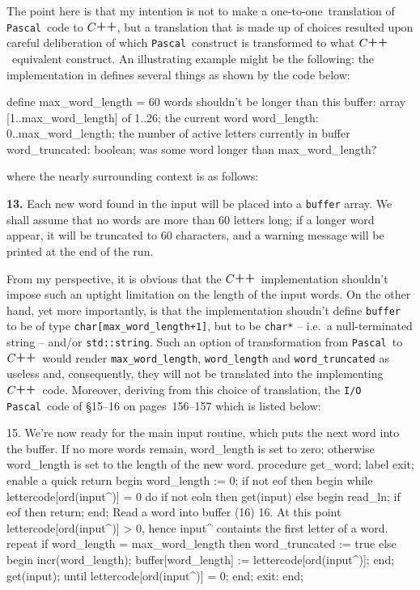 \documentclass[a4paper,11pt]{article}
\renewcommand{\=}{\protect\nobreakdash-\hspace{0pt}}
\renewcommand{\~}{\protect\nobreakdash--\hspace{0pt}}
\newcommand{\plusplus}{\textbf{\raisebox{1pt}{++}}}
\newcommand{\cplusplus}{$C\plusplus$}
\newcommand{\pascal}{\code{Pascal}}
\newcommand{\ie}{i.e.}
\newcommand{\code}[1]{{\tt{#1}}}
\newcommand\code*[1]{\mbox{\code{#1}}}
\newcommand{\pag}[1]{page~#1}
\newcommand{\pages}[2]{pages~#1\~#2}
\newcommand{\para}[1]{\mbox{\S\hspace{1pt}#1}}
\newcommand{\paras}[2]{\mbox{\S\hspace{1pt}#1--#2}}
\newcommand{\parapag}[3][]{%
	\ifthenelse{\not\equal{#1}{}}{%
		\para{#2}, \emph{#1}, on \pag{#3}%
	}{%
		\para{#2} on \pag{#3}%
	}%
}
\newcommand{\paraspages}[4]{\paras{#1}{#2} on \pages{#3}{#4}}
\newcommand{\onetoone}{one\=to\=one}
\begin{document}
The point here is that my intention is not to make a \onetoone\ translation of
\pascal\ code to \cplusplus, but a translation that is made up of choices resulted
upon careful deliberation of which \pascal\ construct is transformed to what
\cplusplus\ equivalent construct. An illustrating example might be the following:
the implementation in \parapag{13}{156} defines several things as shown by
the code below:
%
\begin{paslisting}
define max_word_length = 60 { words shouldn't be longer than this }
buffer: array [1..max_word_length] of 1..26; { the current word }
word_length: 0..max_word_length;
       { the number of active letters currently in buffer }
word_truncated: boolean;
       { was some word longer than max_word_length? }
\end{paslisting}
%
%
where the nearly surrounding context is as follows:
%
\begin{quoting}
\textbf{13.}
Each new word found in the input will be placed into a \code{buffer} array.
We shall assume that no words are more than 60 letters long; if a longer word
appear, it will be truncated to 60 characters, and a warning message will be
printed at the end of the run.
\end{quoting}
%
From my perspective, it is obvious that the \cplusplus\ implementation shouldn't
impose such an uptight limitation on the length of the input words. On the
other hand, yet more importantly, is that the implementation shoudn't define
\code{buffer} to be of type \code{char[max\_word\_length+1]}, but to be 
\code{char*} -- \ie\ a null\=terminated string -- and/or \code{std::string}.
Such an option of transformation from \pascal\ to \cplusplus\ would render
\code{max\_word\_length},
\code{word\_length} and
\code{word\_truncated}
as useless and, consequently, they will not be translated into the implementing
\cplusplus\ code.
Moreover, deriving from this choice of translation, the \code{I/O} \pascal\ code
of \paraspages{15}{16}{156}{157} which is listed below:
%
\begin{paslisting}[label=get-word-func]
{ 15. We're now ready for the main input routine,
  which puts the next word into the buffer. If no more
  words remain, word_length is set to zero; otherwise
  word_length is set to the length of the new word. }
procedure get_word;
label exit; { enable a quick return }
begin
  word_length := 0;
  if not eof then
  begin
    while lettercode[ord(input^)] = 0 do
      if not eoln then
        get(input)
      else
      begin
         read_ln;
         if eof then return;
      end;
    { Read a word into buffer (16) }
    { 16. At this point lettercode[ord(input^)] > 0,
      hence input^ containts the first letter of a word. }
    repeat
      if word_length = max_word_length then
        word_truncated := true
      else
      begin
        incr(word_length);
        buffer[word_length] := lettercode[ord(input^)];
      end;
      get(input);
    until lettercode[ord(input^)] = 0;
  end;
exit:
end;
\end{paslisting}
\end{document}
